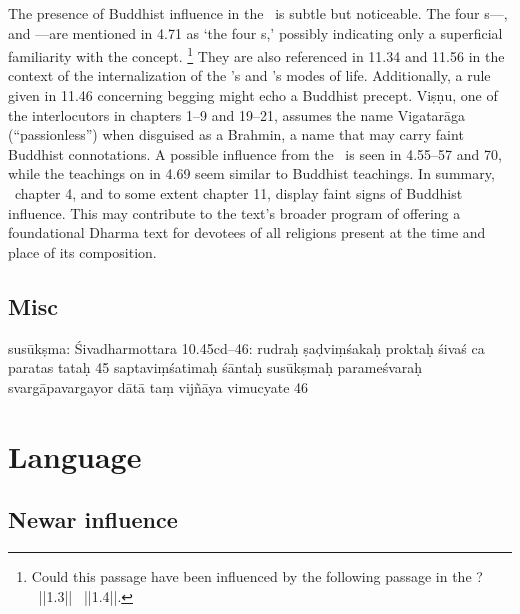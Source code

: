 The presence of Buddhist influence in the \Vss\ is subtle but noticeable. The four s---, and ---are mentioned in 4.71 as `the four s,' possibly indicating only a superficial familiarity with the concept.%
	\footnote{Could this passage have been influenced by 
				the following passage in the \Dharmasamuccaya?		
									\nocite{CaubeDharmasamuccaya}
				~||1.3||
			  ~||1.4||.}
They are also referenced in 11.34 and 11.56 in the context of the internalization of the 's and 's modes of life. Additionally, a rule given in 11.46 concerning begging might echo a Buddhist precept. Viṣṇu, one of the interlocutors in chapters 1--9 and 19--21, assumes the name Vigatarāga (``passionless'') when disguised as a Brahmin, a name that may carry faint Buddhist connotations. A possible influence from the \Buddhacarita\ is seen in 4.55--57 and 70, while the teachings on  in 4.69 seem similar to Buddhist teachings. In summary, \VSS\ chapter 4, and to some extent chapter 11, display faint signs of Buddhist influence. This may contribute to the text's broader program of offering a foundational Dharma text for devotees of all religions present at the time and place of its composition.


\subsection{Misc}

  susūkṣma: Śivadharmottara 10.45cd--46: rudraḥ ṣaḍviṃśakaḥ proktaḥ
  śivaś ca paratas tataḥ \textbar{}\textbar{} 45 \textbar{}\textbar{}
  saptaviṃśatimaḥ śāntaḥ susūkṣmaḥ parameśvaraḥ \textbar{}
  svargāpavargayor dātā taṃ vijñāya vimucyate \textbar{}\textbar{} 
  46
  







\section{Language}\label{language}

\subsection{Newar influence}
\label{newar}

